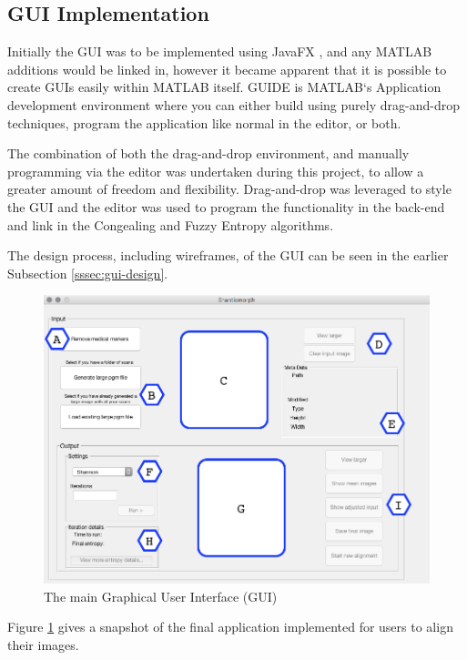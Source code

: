 \subsection{GUI Implementation}
\label{ssec:GUI-implement}

Initially the \acrfull{GUI} was to be implemented using JavaFX \cite{javafx}, and any MATLAB additions would be linked in, however it became apparent that it is possible to create \acrshort{GUI}s easily within MATLAB itself. GUIDE \cite{guide} is MATLAB`s Application development environment where you can either build using purely drag-and-drop techniques, program the application like normal in the editor, or both.

The combination of both the drag-and-drop environment, and manually programming via the editor was undertaken during this project, to allow a greater amount of freedom and flexibility. Drag-and-drop was leveraged to style the \acrshort{GUI} and the editor was used to program the functionality in the back-end and link in the \Gls{Congealing} and Fuzzy Entropy algorithms.

The design process, including wireframes, of the \acrshort{GUI} can be seen in the earlier Subsection \ref{sssec:gui-design}.

\begin{figure}[H]
  \center
  \includegraphics[scale=0.5]{Chapter2/software-img/final_gui.png}
  \caption{The main Graphical User Interface (GUI)}
  \label{fig:final_gui_pic}
\end{figure}

Figure \ref{fig:final_gui_pic} gives a snapshot of the final application implemented for users to align their images.

